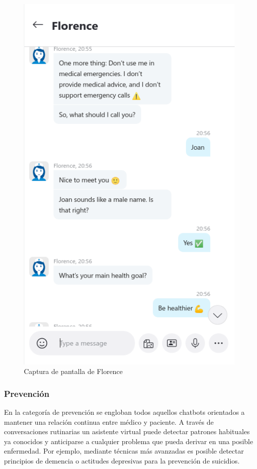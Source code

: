 \begin{figure}[htbp]
\centering
\includegraphics[scale=0.5]{../images/florence.png} 
\caption{Captura de pantalla de Florence}
\label{fig:x captura florence}
\end{figure}

\subsubsection{Prevención}
En la categoría de prevención se engloban todos aquellos chatbots orientados a mantener una relación continua entre médico y paciente. A través de conversaciones rutinarias un asistente virtual puede detectar patrones habituales ya conocidos y anticiparse a cualquier problema que pueda derivar en una posible enfermedad. Por ejemplo, mediante técnicas más avanzadas es posible detectar principios de demencia \cite{detectDementia} o actitudes depresivas para la prevención de suicidios.\\


